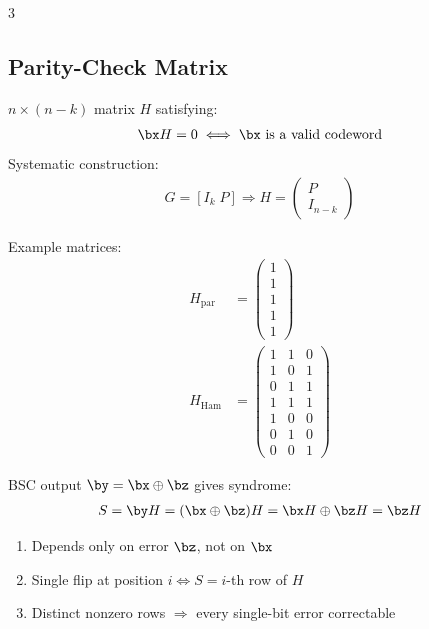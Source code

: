 \documentclass[12pt, a4paper]{article}
\begin{document}
\begin{multicols*}{3}
\colbreak
\subsection{Parity-Check Matrix}
$n\times(n-k)$ matrix $H$ satisfying:
\begin{align*}
  \bx H=0\iff\bx\text{ is a valid codeword}
\end{align*}
Systematic construction:
\begin{align*}
  G=[I_k\;P]\Rightarrow H=\begin{pmatrix}P\\ I_{n-k}\end{pmatrix}
\end{align*}

Example matrices:
\begin{align*}
  H_{\text{par}}&=\begin{pmatrix}1\\ 1\\ 1\\ 1\\ 1\end{pmatrix}\\
  H_{\text{Ham}}&=\begin{pmatrix}
    1&1&0\\
    1&0&1\\
    0&1&1\\
    1&1&1\\
    1&0&0\\
    0&1&0\\
    0&0&1
  \end{pmatrix}
\end{align*}

BSC output $\by=\bx\oplus\bz$ gives syndrome:
\begin{align*}
  S=\by H=(\bx\oplus\bz)H=\bx H\oplus\bz H=\bz H
\end{align*}
\begin{enumerate}[\roman*.]
  \item Depends only on error $\bz$, not on $\bx$
  \item Single flip at position $i\iff S=i$-th row of $H$
  \item Distinct nonzero rows $\Rightarrow$ every single-bit error correctable
\end{enumerate}

\colbreak

\end{multicols*}
\end{document}
